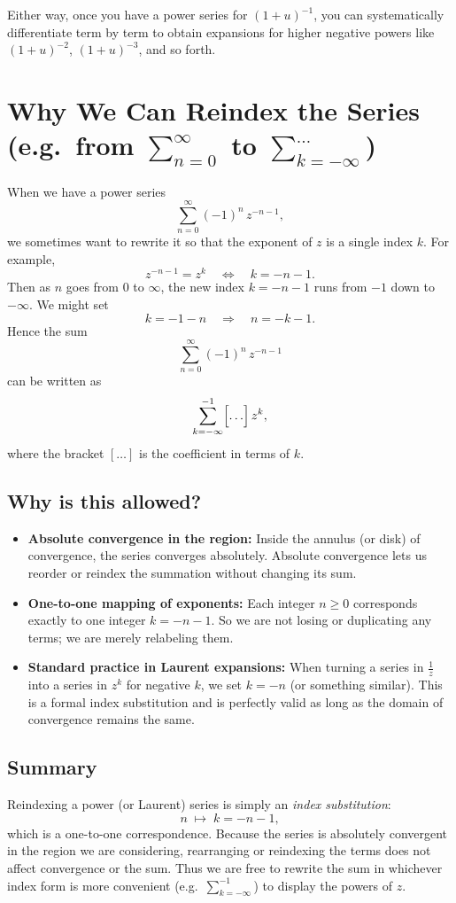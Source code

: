 \documentclass[12pt]{article}
\theoremstyle{definition} %
\theoremstyle{plain} %
\begin{document}
Either way, once you have a power series for \((1+u)^{-1}\), you can systematically differentiate term by term to obtain expansions for higher negative powers like \((1+u)^{-2}\), \((1+u)^{-3}\), and so forth.
\section*{Why We Can Reindex the Series (e.g.\ from \(\sum_{n=0}^\infty\) to \(\sum_{k=-\infty}^{\dots}\))}

When we have a power series 
\[
\sum_{n=0}^\infty (-1)^n\,z^{-n-1},
\]
we sometimes want to rewrite it so that the exponent of \(z\) is a single index \(k\). For example,
\[
z^{-n-1} = z^k
\quad\Longleftrightarrow\quad
k = -n-1.
\]
Then as \(n\) goes from \(0\) to \(\infty\), the new index \(k=-n-1\) runs from \(-1\) down to \(-\infty\). We might set
\[
k=-1-n \quad \Longrightarrow\quad n=-k-1.
\]
Hence the sum 
\[
\sum_{n=0}^\infty (-1)^n\,z^{-n-1}
\]
can be written as
\[
\sum_{k=-\infty}^{-1} \Bigl[\ldots\Bigr]\,z^k,
\]
where the bracket \([\ldots]\) is the coefficient in terms of \(k\).

\subsection*{Why is this allowed?}

\begin{itemize}
  \item \textbf{Absolute convergence in the region:} Inside the annulus (or disk) of convergence, the series converges absolutely. Absolute convergence lets us reorder or reindex the summation without changing its sum.
  \item \textbf{One-to-one mapping of exponents:} Each integer \(n\ge0\) corresponds exactly to one integer \(k=-n-1\). So we are not losing or duplicating any terms; we are merely relabeling them. 
  \item \textbf{Standard practice in Laurent expansions:} When turning a series in \(\frac{1}{z}\) into a series in \(z^k\) for negative \(k\), we set \(k=-n\) (or something similar). This is a formal index substitution and is perfectly valid as long as the domain of convergence remains the same.
\end{itemize}

\subsection*{Summary}
Reindexing a power (or Laurent) series is simply an \emph{index substitution}:
\[
n \;\mapsto\; k=-n-1,
\]
which is a one-to-one correspondence. Because the series is absolutely convergent in the region we are considering, rearranging or reindexing the terms does not affect convergence or the sum. Thus we are free to rewrite the sum in whichever index form is more convenient (e.g.\ \(\sum_{k=-\infty}^{-1}\)) to display the powers of \(z\).
\end{document}
